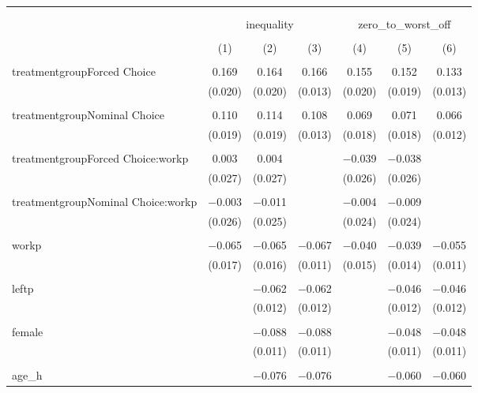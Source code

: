 
\begin{table}[!htbp] \centering 
  \caption{} 
  \label{} 
\begin{tabular}{@{\extracolsep{5pt}}lcccccc} 
\\[-1.8ex]\hline 
\hline \\[-1.8ex] 
\\[-1.8ex] & \multicolumn{3}{c}{inequality} & \multicolumn{3}{c}{zero\_to\_worst\_off} \\ 
\\[-1.8ex] & (1) & (2) & (3) & (4) & (5) & (6)\\ 
\hline \\[-1.8ex] 
 treatmentgroupForced Choice & 0.169 & 0.164 & 0.166 & 0.155 & 0.152 & 0.133 \\ 
  & (0.020) & (0.020) & (0.013) & (0.020) & (0.019) & (0.013) \\ 
  & & & & & & \\ 
 treatmentgroupNominal Choice & 0.110 & 0.114 & 0.108 & 0.069 & 0.071 & 0.066 \\ 
  & (0.019) & (0.019) & (0.013) & (0.018) & (0.018) & (0.012) \\ 
  & & & & & & \\ 
 treatmentgroupForced Choice:workp & 0.003 & 0.004 &  & $-$0.039 & $-$0.038 &  \\ 
  & (0.027) & (0.027) &  & (0.026) & (0.026) &  \\ 
  & & & & & & \\ 
 treatmentgroupNominal Choice:workp & $-$0.003 & $-$0.011 &  & $-$0.004 & $-$0.009 &  \\ 
  & (0.026) & (0.025) &  & (0.024) & (0.024) &  \\ 
  & & & & & & \\ 
 workp & $-$0.065 & $-$0.065 & $-$0.067 & $-$0.040 & $-$0.039 & $-$0.055 \\ 
  & (0.017) & (0.016) & (0.011) & (0.015) & (0.014) & (0.011) \\ 
  & & & & & & \\ 
 leftp &  & $-$0.062 & $-$0.062 &  & $-$0.046 & $-$0.046 \\ 
  &  & (0.012) & (0.012) &  & (0.012) & (0.012) \\ 
  & & & & & & \\ 
 female &  & $-$0.088 & $-$0.088 &  & $-$0.048 & $-$0.048 \\ 
  &  & (0.011) & (0.011) &  & (0.011) & (0.011) \\ 
  & & & & & & \\ 
 age\_h &  & $-$0.076 & $-$0.076 &  & $-$0.060 & $-$0.060 \\ 

\end{tabular}
\end{table}
